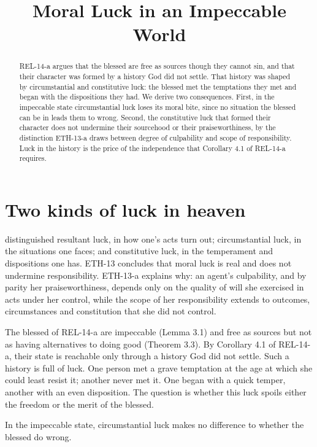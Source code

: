 \documentclass{situationist-preprint}
\title{Moral Luck in an Impeccable World}
\begin{document}
\maketitle

\begin{abstract}
REL-14-a argues that the blessed are free as sources though they cannot sin, and that their character was formed by a history God did not settle. That history was shaped by circumstantial and constitutive luck: the blessed met the temptations they met and began with the dispositions they had. We derive two consequences. First, in the impeccable state circumstantial luck loses its moral bite, since no situation the blessed can be in leads them to wrong. Second, the constitutive luck that formed their character does not undermine their sourcehood or their praiseworthiness, by the distinction ETH-13-a draws between degree of culpability and scope of responsibility. Luck in the history is the price of the independence that Corollary 4.1 of REL-14-a requires.
\end{abstract}

\section{Two kinds of luck in heaven}

\citet{Nagel1979} distinguished resultant luck, in how one's acts turn out; circumstantial luck, in the situations one faces; and constitutive luck, in the temperament and dispositions one has. ETH-13 concludes that moral luck is real and does not undermine responsibility. ETH-13-a explains why: an agent's culpability, and by parity her praiseworthiness, depends only on the quality of will she exercised in acts under her control, while the scope of her responsibility extends to outcomes, circumstances and constitution that she did not control.

The blessed of REL-14-a are impeccable (Lemma 3.1) and free as sources but not as having alternatives to doing good (Theorem 3.3). By Corollary 4.1 of REL-14-a, their state is reachable only through a history God did not settle. Such a history is full of luck. One person met a grave temptation at the age at which she could least resist it; another never met it. One began with a quick temper, another with an even disposition. The question is whether this luck spoils either the freedom or the merit of the blessed.

\begin{proposition}\label{p:circ}
In the impeccable state, circumstantial luck makes no difference to whether the blessed do wrong.
\end{proposition}
\end{document}
